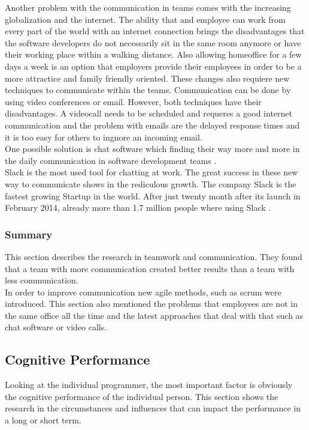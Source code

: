 \bigbreak
Another problem with the communication in teams comes with the increasing globalization and the internet. The ability that and employee can work from every part of the world with an internet connection brings the disadvantages that the software developers do not necessarily sit in the same room anymore or have their working place within a walking distance. 
Also allowing homeoffice for a few days a week is an option that employers provide their employees in order to be a more attractice and family friendly oriented. These changes also requiere new techniques to communicate within the teams. Communication can be done by using video conferences or email. However, both techniques have their disadvantages. A videocall needs to be scheduled and requeres a good internet communication and the problem with emails are the delayed response times and it is too easy for others to ingnore an incoming email\cite{carmel1999global}.\\
One possible solution is chat software which finding their way more and more in the daily communication in software development teams \cite{jarvenpaa1998communication}.\\ 
Slack is the most used tool for chatting at work. The great success in these new way to communicate shows in the rediculous growth. The company Slack is the fastest growing Startup in the world. After just twenty month after its launch in February 2014, already more than 1.7 million people where using Slack  \cite{bercovici2015}.

\subsubsection{Summary} 
This section describes the research in teamwork and communication. They found that a team with more communication created better results than a team with less communication. \\
In order to improve communication new agile methods, such as scrum were introduced. This section also mentioned the problems that employees are not in the same office all the time and the latest approaches that deal with that such as chat software or video calls. 


\subsection{Cognitive Performance}
Looking at the individual programmer, the most important factor is obviously the cognitive performance of the individual person. This section shows the research in the circumstances and influences that can impact the performance in a long or short term. 

